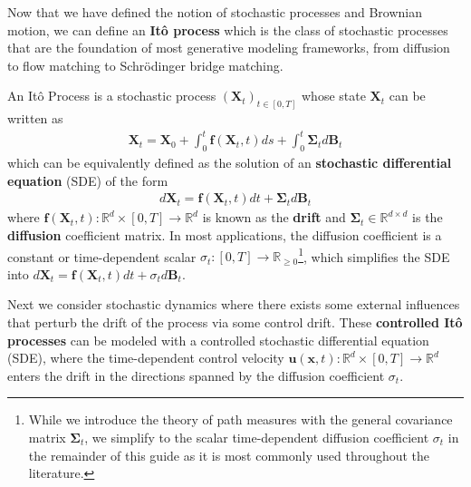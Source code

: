 \documentclass{article}
\newcommand{\boldtext}[1]{\textbf{\textcolor{MyGreen}{#1}}}
\begin{document}
Now that we have defined the notion of stochastic processes and Brownian motion, we can define an \boldtext{Itô process} which is the class of stochastic processes that are the foundation of most generative modeling frameworks, from diffusion to flow matching to Schrödinger bridge matching.

\begin{definition}
An Itô Process is a stochastic process $(\boldsymbol{X}_t)_{t\in[0,T]}$ whose state $\boldsymbol{X}_t$ can be written as
\begin{align}
    \boldsymbol{X}_t=\boldsymbol{X}_0+\int_0^t\boldsymbol{f}(\boldsymbol{X}_t, t)ds+\int_0^t\boldsymbol{\Sigma}_td\boldsymbol{B}_t\label{eq:ito-sde2}
\end{align}
which can be equivalently defined as the solution of an \textbf{stochastic differential equation} (SDE) of the form
\begin{align}
    d\boldsymbol{X}_t=\boldsymbol{f}(\boldsymbol{X}_t,t)dt+\boldsymbol{\Sigma}_td\boldsymbol{B}_t\label{eq:ito-sde}
\end{align}
where $\boldsymbol{f}(\boldsymbol{X}_t, t):\mathbb{R}^d\times [0,T] \to \mathbb{R}^d$ is known as the \textbf{drift} and $\boldsymbol{\Sigma}_t\in \mathbb{R}^{d\times d}$ is the \textbf{diffusion} coefficient matrix. In most applications, the diffusion coefficient is a constant or time-dependent scalar $\sigma_t:[0,T] \to \mathbb{R}_{\geq 0}$\footnote{While we introduce the theory of path measures with the general covariance matrix $\boldsymbol{\Sigma}_t$, we simplify to the scalar time-dependent diffusion coefficient $\sigma_t$ in the remainder of this guide as it is most commonly used throughout the literature.}, which simplifies the SDE into $d\boldsymbol{X}_t=\boldsymbol{f}(\boldsymbol{X}_t,t)dt+\sigma_td\boldsymbol{B}_t$.
\end{definition}

Next we consider stochastic dynamics where there exists some external influences that perturb the drift of the process via some control drift. These \boldtext{controlled Itô processes} can be modeled with a controlled stochastic differential equation (SDE), where the time-dependent control velocity $\boldsymbol{u}(\boldsymbol{x},t):\mathbb{R}^d\times [0,T]\to \mathbb{R}^d$ enters the drift in the directions spanned by the diffusion coefficient $\sigma_t$. 
\end{document}
